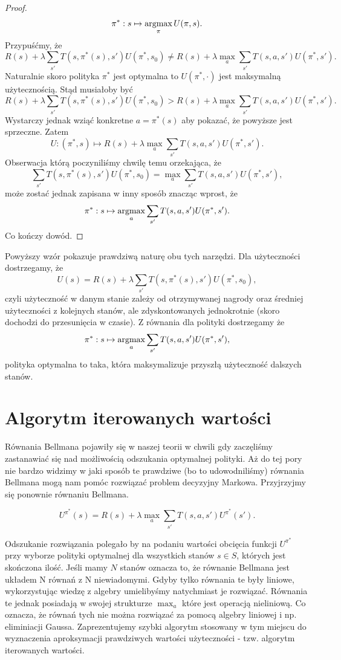 \documentclass[10pt,a4paper]{book}
\newcommand{\argmax}{\operatornamewithlimits{argmax}}
\begin{document}
\begin{proof}
$$
\pi^\ast : s \mapsto \argmax_{\pi}  U(\pi,s).
$$
Przypuśćmy, że 
$$
R(s) + \lambda \sum_{s'} T(s,\pi^\ast(s), s') U(\pi^\ast, s_0) \neq 
R(s) + \lambda \max_{a} \sum_{s'} T(s,a,s') U(\pi^\ast, s').
$$
Naturalnie skoro polityka $\pi^\ast$ jest optymalna to $U(\pi^\ast, \cdot)$ jest maksymalną użytecznością. Stąd musiałoby być
$$
R(s) + \lambda \sum_{s'} T(s,\pi^\ast(s), s') U(\pi^\ast, s_0) > 
R(s) + \lambda \max_{a} \sum_{s'} T(s,a,s') U(\pi^\ast, s').
$$
Wystarczy jednak wziąć konkretne $a = \pi^\ast(s)$ aby pokazać, że powyższe jest sprzeczne. Zatem 
$$
U: (\pi^\ast, s) \mapsto R(s) + \lambda \max_{a} \sum_{s'} T(s,a,s') U(\pi^\ast, s').
$$
Obserwacja którą poczyniliśmy chwilę temu orzekająca, że 
$$
\sum_{s'} T(s,\pi^\ast(s), s') U(\pi^\ast, s_0) = \max_{a} \sum_{s'} T(s,a,s') U(\pi^\ast, s'),
$$
może zostać jednak zapisana w inny sposób znacząc wprost, że 
$$
\pi^\ast : s \mapsto \argmax_{a} \sum_{s'} T(s,a,s') U(\pi^\ast, s').
$$
Co kończy dowód.
\end{proof}

Powyższy wzór pokazuje prawdziwą naturę obu tych narzędzi.
Dla użyteczności dostrzegamy, że
$$
U(s) = R(s) + \lambda \sum_{s'} T(s,\pi^\ast(s), s') U(\pi^\ast, s_0),
$$
czyli użyteczność w danym stanie zależy od otrzymywanej nagrody oraz średniej użyteczności z kolejnych stanów, ale zdyskontowanych jednokrotnie (skoro dochodzi do przesunięcia w czasie). Z równania dla polityki dostrzegamy że
$$
\pi^\ast : s \mapsto \argmax_{a} \sum_{s'} T(s,a,s') U(\pi^\ast, s'),
$$
polityka optymalna to taka, która maksymalizuje przyszłą użyteczność dalszych stanów.

\section{Algorytm iterowanych wartości}

Równania Bellmana pojawiły się w naszej teorii w chwili gdy zaczęliśmy zastanawiać się nad możliwością odszukania optymalnej polityki. Aż do tej pory nie bardzo widzimy w jaki sposób te prawdziwe (bo to udowodniliśmy) równania Bellmana mogą nam pomóc rozwiązać problem decyzyjny Markowa. Przyjrzyjmy się ponownie równaniu Bellmana.

$$
U^{\pi^\ast}(s) = R(s) + \lambda \max_{a} \sum_{s'} T(s,a,s') U^{\pi^\ast}( s').
$$

Odszukanie rozwiązania polegało by na podaniu wartości obcięcia funkcji $U^{\pi^\ast}$ przy wyborze polityki optymalnej dla wszystkich stanów $s \in S$, których jest skończona ilość. Jeśli mamy $N$ stanów oznacza to, że równanie Bellmana jest układem N równań z N niewiadomymi. Gdyby tylko równania te były liniowe, wykorzystując wiedzę z algebry umielibyśmy natychmiast je rozwiązać. Równania te jednak posiadają w swojej strukturze $\max_{a}$ które jest operacją nieliniową. Co oznacza, że równań tych nie można rozwiązać za pomocą algebry liniowej i np. eliminiacji Gaussa. Zaprezentujemy szybki algorytm stosowany w tym miejscu do wyznaczenia aproksymacji prawdziwych wartości użyteczności - tzw. algorytm iterowanych wartości.
\end{document}
